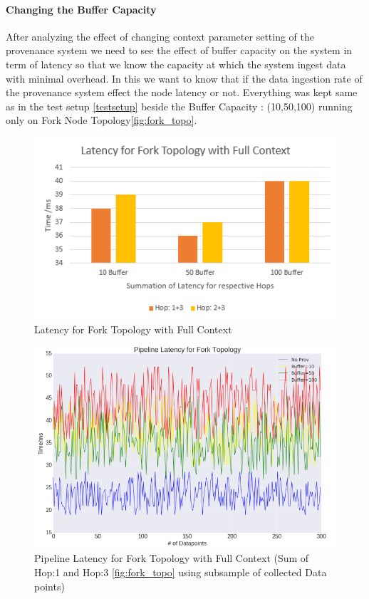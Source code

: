 \paragraph*{Changing the Buffer Capacity}
After analyzing the effect of changing context parameter setting of the provenance system we need to see the effect of buffer capacity on the system in term of latency so that we know the capacity at which the system ingest data with minimal overhead. In this we want to know that if the data ingestion rate of the provenance system effect the node latency or not.
Everything was kept same as in the test setup \ref{testsetup} beside the Buffer Capacity : (10,50,100) running only on Fork Node Topology\ref{fig:fork_topo}.

\begin{figure}[H]
	\center
	\includegraphics[width=\textwidth]{figures/buffer-fork.PNG}
	\caption{Latency for Fork Topology with Full Context}
	\label{fig:forktopo_latency_buffer_bar}
\end{figure}

\begin{figure}[H]
	\center
	\includegraphics[width=\textwidth]{figures/pipeline_buffer.png}
	\caption{Pipeline Latency for Fork Topology with Full Context (Sum of Hop:1 and Hop:3 \ref{fig:fork_topo} using subsample of collected Data points)}
	\label{fig:forktopo_latency_buffer}
\end{figure}

